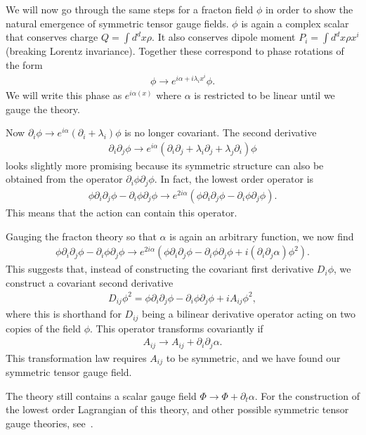 \documentclass[a4paper,11pt]{article}
\begin{document}
We will now go through the same steps for a fracton field $\phi$ in order to show the natural emergence of symmetric tensor gauge fields. $\phi$ is again a complex scalar that conserves charge $Q=\int d^dx\rho$. It also conserves dipole moment $P_i = \int d^dx\rho x^i$ (breaking Lorentz invariance). Together these correspond to phase rotations of the form 
\begin{align}
\phi\to e^{i\alpha+i\lambda_ix^i}\phi.
\end{align}
We will write this phase as $e^{i\alpha(x)}$ where $\alpha$ is restricted to be linear until we gauge the theory.

Now $\partial_i\phi\to e^{i\alpha}(\partial_i+\lambda_i)\phi$ is no longer covariant. The second derivative 
\begin{align}
\partial_i\partial_j\phi\to e^{i\alpha}(\partial_i\partial_j+\lambda_i\partial_j+\lambda_j\partial_i)\phi
\end{align}
looks slightly more promising because its symmetric structure can also be obtained from the operator $\partial_i\phi\partial_j\phi$. In fact, the lowest order operator is~\cite{PretkoFractonGauge}
\begin{align}
\phi\partial_i\partial_j\phi-\partial_i\phi\partial_j\phi \to e^{2i\alpha} \left(\phi\partial_i\partial_j\phi-\partial_i\phi\partial_j\phi\right).
\end{align}
This means that the action can contain this operator.

Gauging the fracton theory so that $\alpha$ is again an arbitrary function, we now find
\begin{align}
\phi\partial_i\partial_j\phi-\partial_i\phi\partial_j\phi \to e^{2i\alpha} \left(\phi\partial_i\partial_j\phi-\partial_i\phi\partial_j\phi + i(\partial_i\partial_j\alpha)\phi^2\right).
\end{align}
This suggests that, instead of constructing the covariant first derivative $D_i\phi$, we construct a covariant second derivative 
\begin{align}
D_{ij}\phi^2=\phi\partial_i\partial_j\phi-\partial_i\phi\partial_j\phi + iA_{ij}\phi^2,
\end{align}
where this is shorthand for $D_{ij}$ being a bilinear derivative operator acting on two copies of the field $\phi$. This operator transforms covariantly if 
\begin{align}
A_{ij}\to A_{ij}+\partial_i\partial_j\alpha.
\end{align}
This transformation law requires $A_{ij}$ to be symmetric, and we have found our symmetric tensor gauge field. 

The theory still contains a scalar gauge field $\Phi\to\Phi+\partial_t\alpha$. For the construction of the lowest order Lagrangian of this theory, and other possible symmetric tensor gauge theories, see~\cite{PretkoFractonGauge}.
\end{document}
